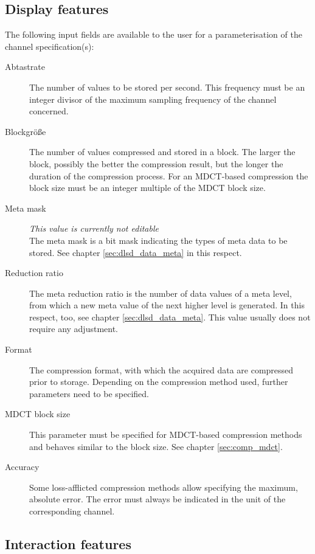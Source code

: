 \documentclass[a4paper,12pt,BCOR6mm,bibtotoc,idxtotoc]{scrbook}
\begin{document}
\subsection{Display features}

The following input fields are available to the user for a parameterisation of the channel specification(s):

\begin{description} 
\item[Abtastrate] The number of values to be stored per second. This frequency must be an integer divisor of the maximum sampling frequency of the channel concerned. 
\item[Blockgröße] The number of values compressed and stored in a block. The larger the block, possibly the better the compression result, but the longer the duration of the compression process. For an MDCT-based compression the block size must be an integer multiple of the MDCT block size. 
\item[Meta mask] \textit{This value is currently not editable}\\ The meta mask is a bit mask indicating the types of meta data to be stored. See chapter \ref{sec:dlsd_data_meta} in this respect. 
\item[Reduction ratio] The meta reduction ratio is the number of data values of a meta level, from which a new meta value of the next higher level is generated. In this respect, too, see chapter \ref{sec:dlsd_data_meta}. This value usually does not require any adjustment. 
\item[Format] The compression format, with which the acquired data are compressed prior to storage. Depending on the compression method used, further parameters need to be specified. 
\item[MDCT block size] This parameter must be specified for MDCT-based compression methods and behaves similar to the block size. See chapter \ref{sec:comp_mdct}. 
\item[Accuracy]  Some loss-afflicted compression methods allow specifying the maximum, absolute error. The error must always be indicated in the unit of the corresponding channel. \end{description}


\subsection{Interaction features}
\end{document}

